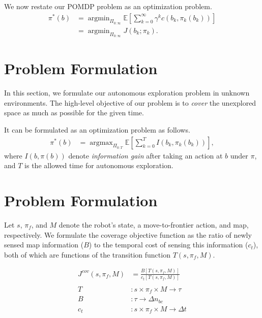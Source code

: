 \documentclass[letterpaper, 10 pt, conference]{ieeeconf}  %
\newcommand{\argmax}{\mathop{\mathrm{argmax}}}
\newcommand{\argmin}{\mathop{\mathrm{argmin}}}
\begin{document}
We now restate our POMDP problem as an optimization problem.
\begin{align}
  \pi^*(b) & = \argmin_{\Pi_{0:\infty}} \mathbb{E} \left[ \sum_{k=0}^\infty \gamma^k c(b_k, \pi_k(b_k)) \right]
  \nonumber \\ 
  &  = \argmin_{\Pi_{0:\infty}} J(b_k; \pi_k).
  \label{eq:optonline}
\end{align}


\section{Problem Formulation}

In this section, we formulate our autonomous exploration problem in unknown environments.
The high-level objective of our problem is to \textit{cover} the unexplored space as much as possible for the given time.

It can be formulated as an optimization problem as follows.
\begin{align}
  \pi^*(b) & = \argmax_{\Pi_{0:T}} \mathbb{E} \left[ \sum_{k=0}^T I(b_k, \pi_k(b_k)) \right],
\end{align}
where $I(b, \pi(b))$ denote \textit{information gain} after taking an action at $b$ under $\pi$,
and $T$ is the allowed time for autonomous exploration.



\section{Problem Formulation}
Let $s$, $\pi_f$, and $M$ denote the robot's state, a move-to-frontier action, and map, respectively. We formulate the coverage objective function as the ratio of newly sensed map information ($B$) to the temporal cost of sensing this information ($c_t$), both of which are functions of the transition function $T(s,\pi_f,M)$.

\begin{align}
    J^{cov}(s,\pi_f,M) &= \frac{B[T(s,\pi_f,M)]}{c_t[T(s,\pi_f,M)]} \\ \nonumber \\ 
    T &\colon s \times \pi_f \times M\to \tau \nonumber \\
    B &\colon \tau\to \Delta n_{bc} \nonumber \\
    c_t &\colon s \times \pi_f \times M\to \Delta t \nonumber 
\end{align}
\end{document}
